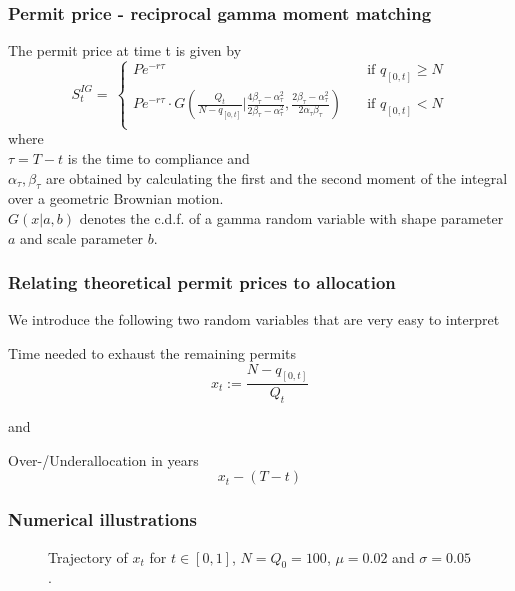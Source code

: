 \begin{frame}
  \frametitle{Permit price - reciprocal gamma moment matching}
    \begin{block}{}
    The permit price at time t is given by
$$
S_t^{IG}  = \ \left\{
         \begin{array}{ll}
            P e^{-r\tau}
            & \quad \mbox{if $q_{[0,t]} \ge N$} \\
            P e^{-r\tau} \cdot G \left(\frac{Q_t}{N - q_{[0,t]}} | \frac{4\beta_{\tau} - \alpha^2_{\tau}}{2\beta_{\tau} - \alpha^2_{\tau}} , \frac{2\beta_{\tau} - \alpha^2_{\tau}}{2 \alpha_{\tau} \beta_{\tau}}  \right)
            & \quad \mbox{if $q_{[0,t]} < N$} \\
         \end{array} \right.
$$
where \\
$\tau = T - t$ is the time to compliance and \\
$\alpha_{\tau}, \beta_{\tau}$ are obtained by calculating the first and the second moment of the integral over a geometric Brownian motion. \\
$G(x|a,b)$ denotes the c.d.f. of a gamma random variable with shape parameter $a$ and scale parameter $b$.
    \end{block}
\end{frame}

\begin{frame}
  \frametitle{Relating theoretical permit prices to allocation}
    We introduce the following two random variables that are very easy to interpret
    \begin{block}{Time needed to exhaust the remaining permits}
$$
x_t := \frac{N - q_{[0,t]}}{Q_t}
$$
    \end{block}
and
\begin{block}{Over-/Underallocation in years}
$$
x_t - (T-t)
$$
    \end{block}
\end{frame}

\begin{frame}
  \frametitle{Numerical illustrations }
\begin{center}
\begin{figure}[h!]
\centering
{}
\caption{Trajectory of $x_t$ for $t \in [0,1]$,  $N = Q_0 = 100$, $\mu = 0.02$ and $\sigma = 0.05$.}
\label{fig:plot4}
\end{figure}
\end{center}
\end{frame}

